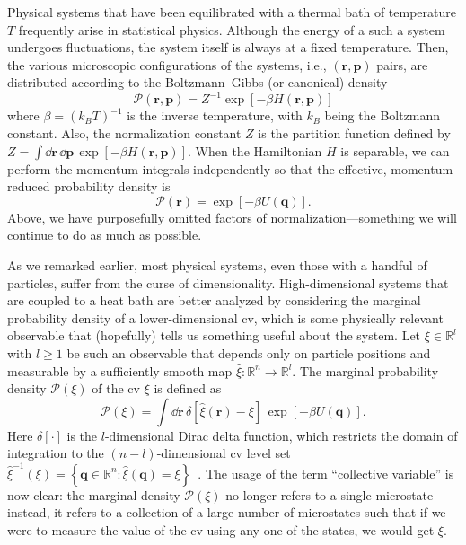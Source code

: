 Physical systems that have been equilibrated with a thermal bath of temperature $T$ frequently arise in statistical physics.
Although the energy of a such a system undergoes fluctuations, the system itself is always at a fixed temperature.
Then, the various microscopic configurations of the systems, i.e., $(\bm{r}, \bm{p})$ pairs, are distributed according to the Boltzmann--Gibbs (or canonical) density
%
\begin{equation}
  \mathscr{P}(\bm{r}, \bm{p}) = Z^{-1}\exp\left[-\beta H(\bm{r}, \bm{p})\right]
\end{equation}
%
where $\beta = (k_{B}T)^{-1}$ is the inverse temperature, with $k_{B}$ being the Boltzmann constant.
Also, the normalization constant $Z$ is the partition function defined by $Z = \int \dd{\bm{r}}\,\dd{\bm{p}}\, \exp\left[-\beta H(\bm{r}, \bm{p})\right]$.
When the Hamiltonian $H$ is separable, we can perform the momentum integrals independently so that the effective, momentum-reduced probability density is
%
\begin{equation}
  \mathscr{P}(\bm{r}) = \exp\left[-\beta U(\bm{q})\right].
\end{equation}
%
Above, we have purposefully omitted factors of normalization---something we will continue to do as much as possible.

As we remarked earlier, most physical systems, even those with a handful of particles, suffer from the curse of dimensionality.
High-dimensional systems that are coupled to a heat bath are better analyzed by considering the marginal probability density of a lower-dimensional \ac{cv}, which is some physically relevant observable that (hopefully) tells us something useful about the system.
Let $\xi \in \mathbb{R}^{l}$ with $l \geq 1$ be such an observable that depends only on particle positions and measurable by a sufficiently smooth map $\hat{\xi}: \mathbb{R}^{n} \to \mathbb{R}^{l}$.
The marginal probability density $\mathscr{P}(\xi)$ of the \ac{cv} $\xi$ is defined as
%
\begin{equation}
  \boxed{\mathscr{P}(\xi) = \int \dd{\bm{r}}\, \delta\left[\hat{\xi}(\bm{r}) - \xi\right]\,\exp\left[-\beta U(\bm{q})\right].}
  \label{c03:eq:probtrans}
\end{equation}
%
Here $\delta[\cdot]$ is the $l$-dimensional Dirac delta function, which restricts the domain of integration to the $(n-l)$-dimensional \ac{cv} level set $\hat{\xi}^{-1}(\xi) = \left\{\bm{q} \in \mathbb{R}^{n}: \hat{\xi}(\bm{q}) = \xi\right\}$~\cite{hartmann2011}.
The usage of the term ``collective variable'' is now clear: the marginal density $\mathscr{P}(\xi)$ no longer refers to a single microstate---instead, it refers to a collection of a large number of microstates such that if we were to measure the value of the \ac{cv} using any one of the states, we would get $\xi$.

